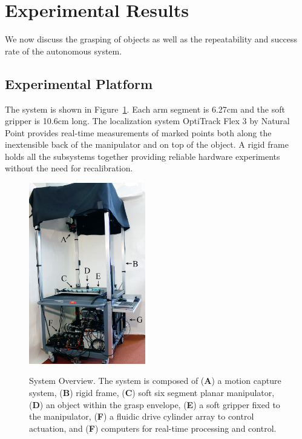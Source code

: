\section{Experimental Results}
\label{sec:experimental_results}
We now discuss the grasping of objects as well as the repeatability and success rate of the autonomous system.
 
\subsection{Experimental Platform}
The  system is shown in Figure~\ref{fig:experimental_platform}.
Each arm segment is 6.27\unit{cm} and the soft gripper is 10.6\unit{cm} long.
The localization system OptiTrack Flex 3 by Natural Point provides real-time measurements of marked points both along the inextensible back of the manipulator and on top of the object. 
A rigid frame holds all the subsystems  together providing reliable hardware experiments without the need for recalibration.

\begin{figure}[htbp]
\begin{centering}
  \includegraphics[width=2.0in]{Figures/system_overview/sys_overview_smaller}\\
  \caption{System Overview. The system is composed of (\textbf{A}) a motion capture system, (\textbf{B}) rigid frame, (\textbf{C}) soft six segment planar manipulator, (\textbf{D}) an object within the grasp envelope, (\textbf{E}) a soft gripper fixed to the manipulator, (\textbf{F}) a fluidic drive cylinder array to control actuation, and (\textbf{F}) computers for real-time processing and control.} \label{fig:experimental_platform}
\end{centering}
\end{figure}


